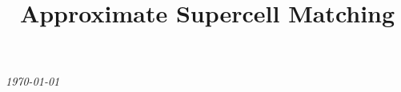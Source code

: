 \documentclass[preprint]{iucr}              %
\numberwithin{equation}{section}
\begin{document}
	
	
	
	
	
	
	
	
	
	
	
	\begin{center}
	{\LARGE \emph{\today}} \\
\end{center}

\title{Approximate Supercell Matching}

\end{document}
